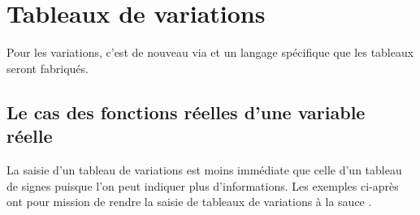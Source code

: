 \documentclass{tutodoc}
\begin{document}
\section{Tableaux de variations}

\begin{tdocnote}
	Pour les variations, c'est de nouveau via  et un langage spécifique que les tableaux seront fabriqués.
\end{tdocnote}




\subsection{Le cas des fonctions réelles d'une variable réelle}

La saisie d'un tableau de variations est moins immédiate que celle d'un tableau de signes puisque l'on peut indiquer plus d'informations. Les exemples ci-après ont pour mission de rendre  la saisie de tableaux de variations à la sauce \thisproj.
\end{document}
